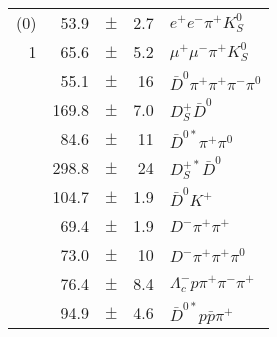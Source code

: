 \begin{center}
\begin{tabular}{|rrcrl|}
\hline                     
[28](0) & 53.9  & $\pm$ & 2.7   & $e^+ e^- \pi^+ K_S^0 $\\
1       & 65.6  & $\pm$ & 5.2   & $\mu^+ \mu^- \pi^+ K_S^0 $\\
\hline                     
[4]     & 55.1  & $\pm$ & 16    & $\bar{D}^0\pi^+\pi^+\pi^-\pi^0$\\
\hline                     
[14]    &169.8  & $\pm$ & 7.0   & $D^+_S\bar{D}^0$              \\
\hline                     
[16]    & 84.6  & $\pm$ & 11    & $\bar{D}^{0*}\pi^+\pi^0$      \\
\hline                     
[20]    &298.8  & $\pm$ & 24    & $D^{+*}_S\bar{D}^0$           \\
\hline                     
[22]    &104.7  & $\pm$ & 1.9   & $\bar{D}^0 K^+$               \\
\hline                     
[23]    & 69.4  & $\pm$ & 1.9   & $D^-\pi^+\pi^+$               \\
\hline                     
[24]    & 73.0  & $\pm$ & 10    & $D^-\pi^+\pi^+\pi^0$          \\
\hline                     
[30]    & 76.4  & $\pm$ & 8.4   & $\Lambda^-_cp\pi^+\pi^-\pi^+$ \\
\hline                     
[31]    & 94.9  & $\pm$ & 4.6   & $\bar{D}^{0*}p\bar{p}\pi^+$   \\
\hline
\end{tabular}
\end{center}
